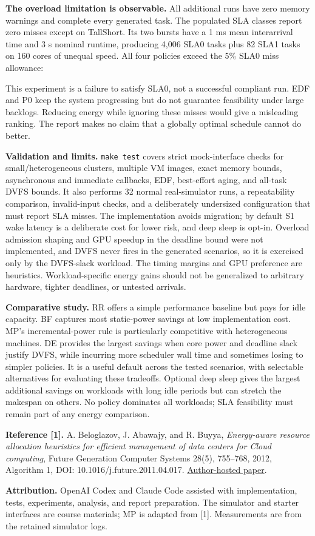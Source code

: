 \documentclass[10pt,letterpaper]{article}
\begin{document}
\textbf{The overload limitation is observable.} All additional runs have zero
memory warnings and complete every generated task. The populated SLA classes
report zero misses except on TallShort. Its two bursts have a 1 ms mean interarrival
time and 3 s nominal runtime, producing 4,006 SLA0 tasks plus 82 SLA1 tasks on 160
cores of unequal speed. All four policies exceed the 5\% SLA0 miss allowance:
\begin{center}
\small

\end{center}
This experiment is a failure to satisfy SLA0, not a successful compliant run.
EDF and P0 keep the system progressing but do not guarantee feasibility under
large backlogs. Reducing energy while ignoring these misses would give a misleading
ranking. The report makes no claim that a globally optimal schedule cannot do better.

\textbf{Validation and limits.} \texttt{make test} covers strict mock-interface
checks for small/heterogeneous clusters, multiple VM images, exact memory bounds,
asynchronous and immediate callbacks, EDF, best-effort aging, and all-task DVFS
bounds. It also performs 32 normal real-simulator runs, a repeatability comparison,
invalid-input checks, and a deliberately undersized configuration that must report
SLA misses. The implementation avoids migration; by default S1 wake latency is a deliberate cost for lower risk, and deep sleep is opt-in. Overload admission shaping and GPU speedup in the deadline bound were not implemented, and DVFS never fires in the generated scenarios, so it is exercised only by the DVFS-slack workload. The timing margins and GPU preference are heuristics. Workload-specific energy gains should not be generalized to arbitrary
hardware, tighter deadlines, or untested arrivals.

\textbf{Comparative study.} RR offers a simple performance baseline but pays for
idle capacity. BF captures most static-power savings at low implementation cost.
MP's incremental-power rule is particularly competitive with heterogeneous machines.
DE provides the largest savings when core power and deadline slack justify DVFS,
while incurring more scheduler wall time and sometimes losing to simpler policies.
It is a useful default across the tested scenarios, with selectable alternatives
for evaluating these tradeoffs. Optional deep sleep gives the largest additional savings on workloads with long idle periods but can stretch the makespan on others. No policy dominates all workloads; SLA feasibility must remain part of any energy comparison.

\small
\textbf{Reference [1].} A. Beloglazov, J. Abawajy, and R. Buyya,
\emph{Energy-aware resource allocation heuristics for efficient management of data
centers for Cloud computing}, Future Generation Computer Systems 28(5), 755--768,
2012, Algorithm 1, DOI: 10.1016/j.future.2011.04.017.
\href{https://clouds.cis.unimelb.edu.au/papers/Energy-Aware-CloudResourceAllocation-FGCS2012.pdf}{Author-hosted paper}.

\textbf{Attribution.} OpenAI Codex and Claude Code assisted with implementation,
tests, experiments, analysis, and report preparation. The simulator and starter
interfaces are course materials; MP is adapted from [1]. Measurements are from
the retained simulator logs.
\end{document}
